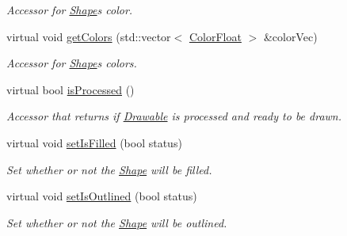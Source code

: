\begin{DoxyCompactItemize}
\begin{DoxyCompactList}\small\item\em Accessor for \hyperlink{classtsgl_1_1_shape}{Shape}\textquotesingle{}s color. \end{DoxyCompactList}\item 
virtual void \hyperlink{classtsgl_1_1_shape_a6f54fe4d049f69a287edf8335a9509f8}{get\+Colors} (std\+::vector$<$ \hyperlink{structtsgl_1_1_color_float}{Color\+Float} $>$ \&color\+Vec)
\begin{DoxyCompactList}\small\item\em Accessor for \hyperlink{classtsgl_1_1_shape}{Shape}\textquotesingle{}s colors. \end{DoxyCompactList}\item 
virtual bool \hyperlink{classtsgl_1_1_shape_adf7724c786882b2bd4375c1e4807ed5d}{is\+Processed} ()
\begin{DoxyCompactList}\small\item\em Accessor that returns if \hyperlink{classtsgl_1_1_drawable}{Drawable} is processed and ready to be drawn. \end{DoxyCompactList}\item 
virtual void \hyperlink{classtsgl_1_1_shape_acf10e14a8b26ced8926fcdeaf42e8728}{set\+Is\+Filled} (bool status)
\begin{DoxyCompactList}\small\item\em Set whether or not the \hyperlink{classtsgl_1_1_shape}{Shape} will be filled. \end{DoxyCompactList}\item 
virtual void \hyperlink{classtsgl_1_1_shape_afedf4a424c24ed38c389f09cd5ecf451}{set\+Is\+Outlined} (bool status)
\begin{DoxyCompactList}\small\item\em Set whether or not the \hyperlink{classtsgl_1_1_shape}{Shape} will be outlined. \end{DoxyCompactList}\end{DoxyCompactItemize}
